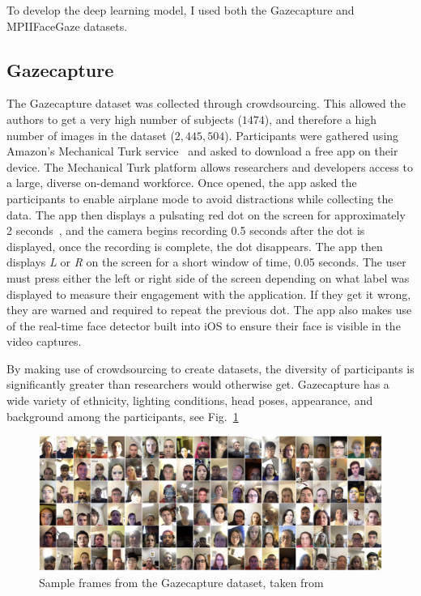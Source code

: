 \documentclass[twocolumn]{report}
\begin{document}
To develop the deep learning model, I used both the Gazecapture and MPIIFaceGaze datasets. 

\subsection{Gazecapture}

The Gazecapture dataset was collected through crowdsourcing. This allowed the authors to get a very high number of subjects ($1474$), and therefore a high number of images in the dataset ($2,445,504$). Participants were gathered using Amazon's Mechanical Turk service~\cite{mturk} and asked to download a free app on their device. The Mechanical Turk platform allows researchers and developers access to a large, diverse on-demand workforce. Once opened, the app asked the participants to enable airplane mode to avoid distractions while collecting the data. The app then displays a pulsating red dot on the screen for approximately 2 seconds~\cite{krafka2016eye}, and the camera begins recording 0.5 seconds after the dot is displayed, once the recording is complete, the dot disappears. The app then displays \textit{L} or \textit{R} on the screen for a short window of time, 0.05 seconds. The user must press either the left or right side of the screen depending on what label was displayed to measure their engagement with the application. If they get it wrong, they are warned and required to repeat the previous dot. The app also makes use of the real-time face detector built into iOS to ensure their face is visible in the video captures.

By making use of crowdsourcing to create datasets, the diversity of participants is significantly greater than researchers would otherwise get. Gazecapture has a wide variety of ethnicity, lighting conditions, head poses, appearance, and background among the participants, see Fig.~\ref{fig:gazecapture-sample}

\begin{figure}[h]
    \begin{center}
        \includegraphics[scale=0.25]{../assets/Screenshot 2024-04-11 at 12.49.10.png}
    \end{center}
    \caption{Sample frames from the Gazecapture dataset, taken from~\cite{krafka2016eye}}
    \label{fig:gazecapture-sample}
\end{figure}
\end{document}
